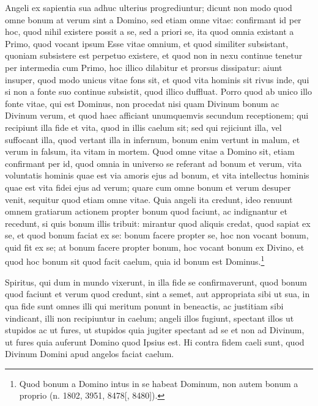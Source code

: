 \begin{topic}{9}
    Angeli ex sapientia sua adhuc ulterius progrediuntur; dicunt non modo quod omne bonum at verum sint a Domino, sed
    etiam omne vitae: confirmant id per hoc, quod nihil existere possit a se, sed a priori se, ita quod omnia existant a
    Primo, quod vocant ipsum Esse vitae omnium, et quod similiter subsistant, quoniam subsistere est perpetuo existere,
    et quod non in nexu continue tenetur per intermedia cum Primo, hoc illico dilabitur et prorsus dissipatur: aiunt
    insuper, quod modo unicus vitae fons sit, et quod vita hominis sit rivus inde, qui si non a fonte suo continue
    subsistit, quod illico duffluat.
    Porro quod ab unico illo fonte vitae, qui est Dominus, non procedat nisi quam Divinum bonum ac Divinum verum, et
    quod haec afficiant unumquemvis secundum receptionem; qui recipiunt illa fide et vita, quod in illis caelum sit; sed
    qui rejiciunt illa, vel suffocant illa, quod vertant illa in infernum, bonum enim vertunt in malum, et verum in
    falsum, ita vitam in mortem.
    Quod omne vitae a Domino sit, etiam confirmant per id, quod omnia in universo se referant ad bonum et verum, vita
    voluntatis hominis quae est via amoris ejus ad bonum, et vita intellectus hominis quae est vita fidei ejus ad verum;
    quare cum omne bonum et verum desuper venit, sequitur quod etiam omne vitae.
    Quia angeli ita credunt, ideo renuunt omnem gratiarum actionem propter bonum quod faciunt, ac indignantur et
    recedunt, si quis bonum illis tribuit: mirantur quod aliquis credat, quod sapiat ex se, et quod bonum faciat ex se:
    bonum facere propter se, hoc non vocant bonum, quid fit ex se; at bonum facere propter bonum, hoc vocant bonum ex
    Divino, et quod hoc bonum sit quod facit caelum, quia id bonum est Dominus.\footnote{Quod bonum a Domino intus in se
    habeat Dominum, non autem bonum a proprio (n. 1802, 3951, 8478[, 8480]).}
\end{topic}

\begin{topic}{10}
    Spiritus, qui dum in mundo vixerunt, in illa fide se confirmaverunt, quod bonum quod faciunt et verum quod credunt,
    sint a semet, aut appropriata sibi ut sua, in qua fide sunt omnes illi qui meritum ponunt in beneactis, ac justitiam
    sibi vindicant, illi non recipiuntur in caelum; angeli illos fugiunt, spectant illos ut stupidos ac ut fures, ut
    stupidos quia jugiter spectant ad se et non ad Divinum, ut fures quia auferunt Domino quod Ipsius est.
    Hi contra fidem caeli sunt, quod Divinum Domini apud angelos faciat caelum.
\end{topic}


